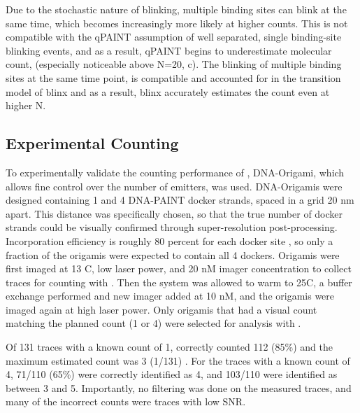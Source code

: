 Due to the stochastic nature of blinking, multiple binding sites can blink at the same time, which becomes increasingly more likely at higher counts.
	This is not compatible with the qPAINT assumption of well separated, single binding-site blinking events, 
	and as a result, qPAINT begins to underestimate molecular count, (especially noticeable above N=20, c). 
	The blinking of multiple binding sites at the same time point, 
	is compatible and accounted for in the transition model of blinx 
	and as a result, blinx accurately estimates the count even at higher N.
	

\subsection{Experimental Counting}
To experimentally validate the counting performance of \ours, DNA-Origami, which allows fine control over the number of emitters, was used.
	DNA-Origamis were designed containing 1 and 4 DNA-PAINT docker strands, spaced in a grid 20 nm apart. 
	This distance was specifically chosen, so that the true number of docker strands could be visually confirmed through super-resolution post-processing.
	Incorporation efficiency is roughly 80 percent for each docker site \cite{strauss_2018}, so only a fraction of the origamis were expected to contain all 4 dockers. 
	Origamis were first imaged at 13 C, low laser power, and 20 nM imager concentration to collect traces for counting with \ours {}.
	Then the system was allowed to warm to 25C, a buffer exchange performed and new imager added at 10 nM, and the origamis were imaged again at high laser power.
	Only origamis that had a visual count matching the planned count (1 or 4) were selected for analysis with \ours.

Of 131 traces with a known count of 1, \ours correctly counted 112 (85\%) and the maximum estimated count was 3 (1/131) .
	For the traces with a known count of 4, 71/110 (65\%) were correctly identified as 4, and 103/110 were identified as between 3 and 5.
	Importantly, no filtering was done on the measured traces, and many of the incorrect counts were traces with low SNR. %
